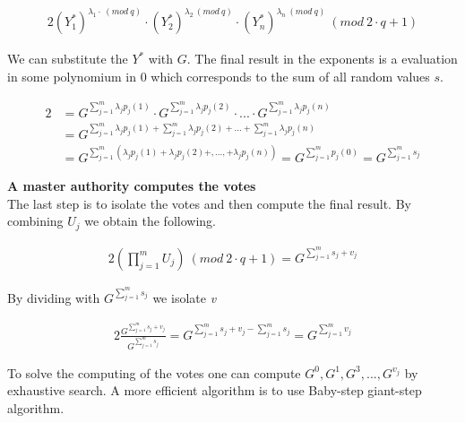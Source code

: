 \begin{alignat*}{2}
(Y_1^*)^{\lambda_1  \cdot  \ (mod \ q)}  \cdot  (Y_2^*)^{\lambda_2 \ (mod \ q)}  \cdot  (Y_n^*)^{\lambda_n \ (mod \ q)} \ (mod \ 2 \cdot q+1)
\end{alignat*}


\noindent
We can substitute the $Y^*$ with $G$. The final result in the exponents is a evaluation in some polynomium in $0$ which corresponds to the sum of all random values $s$.

\begin{alignat*}{2}
&=G^{ \sum\limits_{j=1}^m \lambda_j p_j(1)} \cdot G^{ \sum\limits_{j=1}^m \lambda_j p_j(2)} \cdot...\cdot G^{ \sum\limits_{j=1}^m \lambda_j p_j(n)}\\
&=G^{ \sum\limits_{j=1}^m \lambda_j p_j(1) +  \sum\limits_{j=1}^m \lambda_j p_j(2) +...+  \sum\limits_{j=1}^m \lambda_j p_j(n)}\\
&=G^{ \sum\limits_{j=1}^m (\lambda_j p_j(1)+\lambda_j p_j(2)+,...,+\lambda_{j}p_j(n))} = G^{ \sum\limits_{j=1}^m p_j(0)}= G^{ \sum\limits_{j=1}^m s_j}
\end{alignat*}


\noindent
\textbf{A master authority computes the votes}\\
The last step is to isolate the votes and then compute the final result. By combining \begin{math}U_j \end{math} we obtain the following.

\begin{alignat*}{2}
(\prod\limits_{j=1}^{m} U_{j}) \ (mod \ 2 \cdot q+1)=  G^{ \sum\limits_{j=1}^m s_j +v_j}
\end{alignat*}

\noindent
By dividing with $G^{ \sum\limits_{j=1}^m s_j}$ we isolate \textit{v}

\begin{alignat*}{2}
\frac{G^{ \sum\limits_{j=1}^m s_j +v_j}}{{ G^{ \sum\limits_{j=1}^m s_j} }} =G^{ \sum\limits_{j=1}^m s_j +v_j -\sum\limits_{j=1}^m s_j} = G^{ \sum\limits_{j=1}^m v_j}
\end{alignat*}

\noindent
To solve the computing of the votes one can compute \begin{math}G^0, G^1, G^3,..., G^{v_j} \end{math} by exhaustive search. A more efficient algorithm is to use Baby-step giant-step algorithm. 

